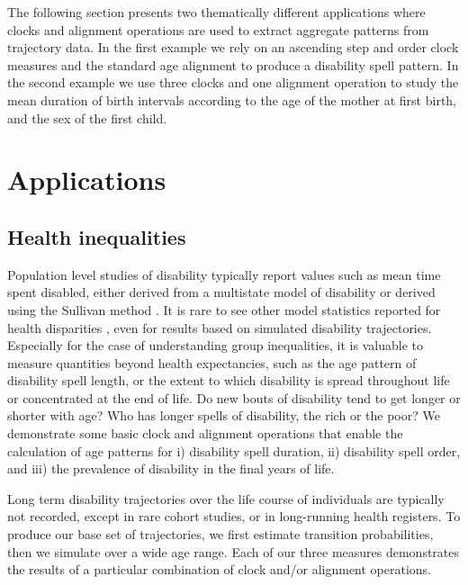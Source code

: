 \documentclass[a4paper,left=1.25cm,right=1.25cm,top=1.25cm,bottom=1.25cm]{article}
\begin{document}
The following section presents two thematically different applications where clocks and alignment operations are used to extract aggregate patterns from trajectory data. In the first example we rely on an ascending step and order clock measures and the standard age alignment to produce a disability spell pattern. In the second example we use three clocks and one alignment operation to study the mean duration of birth intervals according to the age of the mother at first birth, and the sex of the first child.

\section{Applications}

\subsection{Health inequalities}
Population level studies of disability typically report values such as mean time spent disabled, either derived from a multistate model of disability \citep{crimmins2009change} or derived using the Sullivan method \citep{Sullivan1970,Crimmins1997}. It is rare to see other model statistics reported for health disparities \citep{laditka1998new}, even for results based on simulated disability trajectories. Especially for the case of understanding group inequalities, it is valuable to measure quantities beyond health expectancies, such as the age pattern of disability spell length, or the extent to which disability is spread throughout life or concentrated at the end of life. Do new bouts of disability tend to get longer or shorter with age? Who has longer spells of disability, the rich or the poor? We demonstrate some basic clock and alignment operations that enable the calculation of age patterns for i) disability spell duration, ii) disability spell order, and iii) the prevalence of disability in the final years of life.

Long term disability trajectories over the life course of individuals are typically not recorded, except in rare cohort studies, or in long-running health registers. To produce our base set of trajectories, we first estimate transition probabilities, then we simulate over a wide age range. Each of our three measures demonstrates the results of a particular combination of clock and/or alignment operations.
\end{document}
